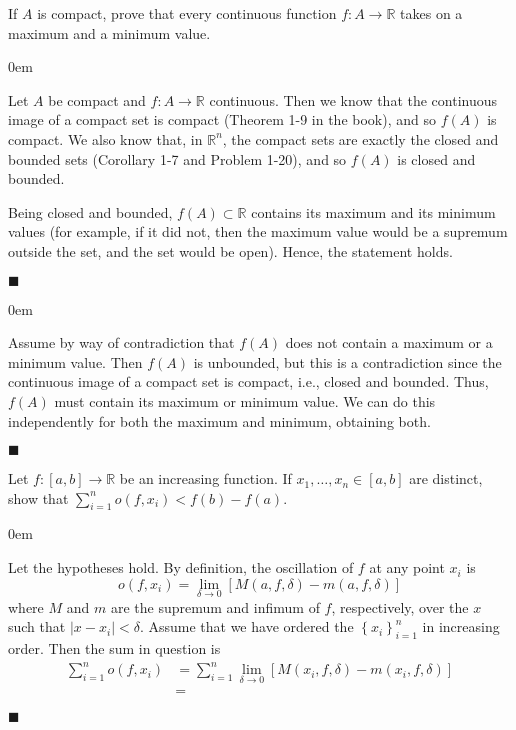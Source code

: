\documentclass[12pt]{article}
\renewcommand{\qed}{\hfill$\blacksquare$}
\renewenvironment{proof}{\begin{addmargin}[1em]{0em}\begin{newproof}}{\end{newproof}\end{addmargin}\qed}
\newenvironment{problem}[2][Problem]{\begin{trivlist}
\item[\hskip \labelsep {\bfseries #1}\hskip \labelsep {\bfseries #2.}]}{\end{trivlist}}
\begin{document}
 
 
 
 
 
 
 
 
 
 

\begin{problem}{1.29}
If $A$ is compact, prove that every continuous function $f:A\rightarrow \mathbb{R}$ takes on a maximum and a minimum value.
\end{problem}

\begin{proof}
Let $A$ be compact and $f:A\rightarrow \mathbb{R}$ continuous. Then we know that the continuous image of a compact set is compact (Theorem 1-9 in the book), and so $f\left(A\right)$ is compact. We also know that, in $\mathbb{R}^n$, the compact sets are exactly the closed and bounded sets (Corollary 1-7 and Problem 1-20), and so $f\left(A\right)$ is closed and bounded.

Being closed and bounded, $f\left(A\right) \subset \mathbb{R}$ contains its maximum and its minimum values (for example, if it did not, then the maximum value would be a supremum outside the set, and the set would be open). Hence, the statement holds.
\end{proof}

\begin{proof}
Assume by way of contradiction that $f\left(A\right)$ does not contain a maximum or a minimum value. Then $f\left(A\right)$ is unbounded, but this is a contradiction since the continuous image of a compact set is compact, i.e., closed and bounded. Thus, $f\left(A\right)$ must contain its maximum or minimum value. We can do this independently for both the maximum and minimum, obtaining both.
\end{proof} 
 
 
 
 
\begin{problem}{1.30}
Let $f:\left[a,b\right]\rightarrow \mathbb{R}$ be an increasing function. If $x_1,\ldots,x_n \in \left[a,b\right]$ are distinct, show that $\sum_{i=1}^n o\left(f,x_i\right) < f\left(b\right)-f\left(a\right)$.
\end{problem}

\begin{proof}
Let the hypotheses hold. By definition, the oscillation of $f$ at any point $x_i$ is
$$ o\left(f,x_i\right) = \lim_{\delta \rightarrow 0} \left[ M\left(a,f,\delta\right) - m\left(a,f,\delta\right)\right]$$ where $M$ and $m$ are the supremum and infimum of $f$, respectively, over the $x$ such that $\left|x-x_i\right|<\delta$. Assume that we have ordered the $\left\{ x_i \right\}_{i=1}^n$ in increasing order. Then the sum in question is
\begin{equation*}
\begin{split}
\sum_{i=1}^n o\left(f,x_i\right) & = \sum_{i=1}^n \lim_{\delta\rightarrow 0} \left[M\left(x_i,f,\delta\right)-m\left(x_i,f,\delta\right)\right] \\
& = 
\end{split}
\end{equation*}
\end{proof} 
 
\end{document}
